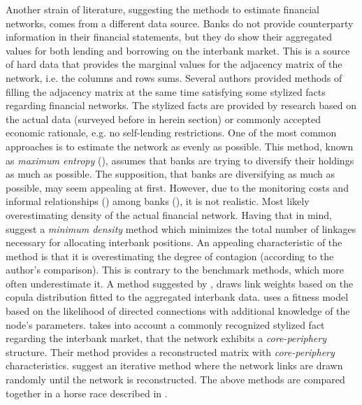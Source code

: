 \documentclass[12pt]{article}
\begin{document}
Another strain of literature, suggesting the methods to estimate financial networks, comes from a different data source. Banks do not provide counterparty information in their financial statements, but they do show their aggregated values for both lending and borrowing on the interbank market. This is a source of hard data that provides the marginal values for the adjacency matrix of the network, i.e. the columns and rows sums. Several authors provided methods of filling the adjacency matrix at the same time satisfying some stylized facts regarding financial networks. The stylized facts are provided by research based on the actual data (surveyed before in herein section) or commonly accepted economic rationale, e.g. no self-lending restrictions. One of the most common approaches is to estimate the network as evenly as possible. This method, known as \textit{maximum entropy} (\cite{upper11}), assumes that banks are trying to diversify their holdings as much as possible. The supposition, that banks are diversifying as much as possible, may seem appealing at first. However, due to the monitoring costs and informal relationships (\cite{brauning16}) among banks (\cite{cocco09}), it is not realistic. Most likely overestimating density of the actual financial network. Having that in mind, \cite{anand15} suggest a \textit{minimum density} method which minimizes the total number of linkages necessary for allocating interbank positions. An appealing characteristic of the method is that it is overestimating the degree of contagion (according to the author's comparison). This is contrary to the benchmark methods, which more often underestimate it. A method suggested by \cite{baral12}, draws link weights based on the copula distribution fitted to the aggregated interbank data. \cite{cimini15} uses a fitness model based on the likelihood  of directed connections with additional knowledge of the node's parameters. \citet{drehmann13} takes into account a commonly recognized stylized fact regarding the interbank market, that the network exhibits a \textit{core-periphery} structure. Their method provides a reconstructed matrix with \textit{core-periphery} characteristics. \cite{halaj13} suggest an iterative method where the network links are drawn randomly until the network is reconstructed. The above methods are compared together in a horse race described in \cite{anand18}.
\end{document}
